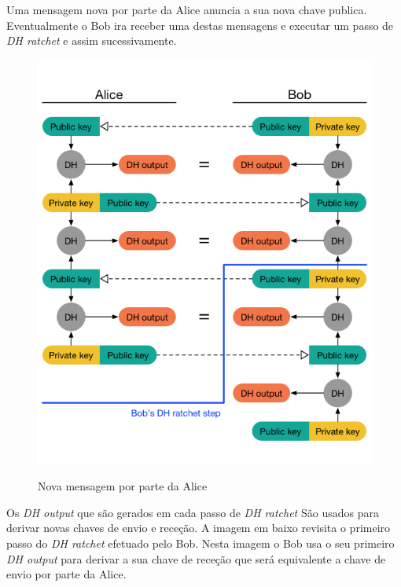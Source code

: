 Uma mensagem nova por parte da Alice anuncia a sua nova chave publica. Eventualmente o Bob ira receber uma destas mensagens e executar um passo de \textit{DH ratchet} e assim sucessivamente.

\begin{figure}[H]
\begin{center}
\includegraphics[width=12cm]{img/DH4.png}
\label{diagram:DH4}
\caption{Nova mensagem por parte da Alice}
\centering
\end{center}
\end{figure}

Os \textit{DH output} que são gerados em cada passo de \textit{DH ratchet} São usados para derivar novas chaves de envio e receção. A imagem em baixo revisita o primeiro passo do \textit{DH ratchet} efetuado pelo Bob. Nesta imagem o Bob usa o seu primeiro \textit{DH output} para derivar a sua chave de receção que será equivalente a chave de envio por parte da Alice.

